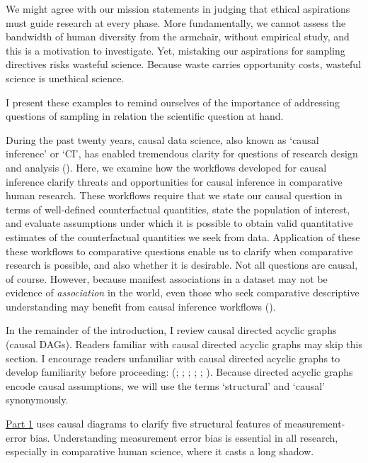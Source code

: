 \documentclass[
  single column]{article}
\begin{document}
We might agree with our mission statements in judging that ethical
aspirations must guide research at every phase. More fundamentally, we
cannot assess the bandwidth of human diversity from the armchair,
without empirical study, and this is a motivation to investigate. Yet,
mistaking our aspirations for sampling directives risks wasteful
science. Because waste carries opportunity costs, wasteful science is
unethical science.

I present these examples to remind ourselves of the importance of
addressing questions of sampling in relation the scientific question at
hand.

During the past twenty years, causal data science, also known as `causal
inference' or `CI', has enabled tremendous clarity for questions of
research design and analysis
().
Here, we examine how the workflows developed for causal inference
clarify threats and opportunities for causal inference in comparative
human research. These workflows require that we state our causal
question in terms of well-defined counterfactual quantities, state the
population of interest, and evaluate assumptions under which it is
possible to obtain valid quantitative estimates of the counterfactual
quantities we seek from data. Application of these these workflows to
comparative questions enable us to clarify when comparative research is
possible, and also whether it is desirable. Not all questions are
causal, of course. However, because manifest associations in a dataset
may not be evidence of \emph{association} in the world, even those who
seek comparative descriptive understanding may benefit from causal
inference workflows ().

In the remainder of the introduction, I review causal directed acyclic
graphs (causal DAGs). Readers familiar with causal directed acyclic
graphs may skip this section. I encourage readers unfamiliar with causal
directed acyclic graphs to develop familiarity before proceeding:
(;
;
;
;
;
). Because directed acyclic graphs
encode causal assumptions, we will use the terms `structural' and
`causal' synonymously.

\hyperref[id-sec-1]{Part 1} uses causal diagrams to clarify five
structural features of measurement-error bias. Understanding measurement
error bias is essential in all research, especially in comparative human
science, where it casts a long shadow.
\end{document}
